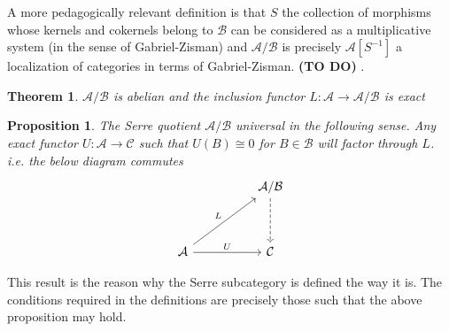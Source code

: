 \documentclass[12pt]{article}
\numberwithin{equation}{section}
\newcounter{dummy} \numberwithin{dummy}{section}
\newtheorem{theorem}[dummy]{Theorem}
\newtheorem{proposition}[dummy]{Proposition}
\begin{document}
\begin{appendices}
	
	A more pedagogically relevant definition is that $S$ the collection of morphisms whose kernels and cokernels belong to $\mathcal{B}$ can be considered as a multiplicative system (in the sense of Gabriel-Zisman) and $\mathcal{A/B}$ is precisely $\mathcal{A}[S^{-1}]$ a localization of categories in terms of Gabriel-Zisman. \textbf{(TO DO)} \cite{gabriel1967calculus}.
	\begin{theorem}
		$\mathcal{A/B}$ is abelian and the inclusion functor $L:\mathcal{A} \to \mathcal{A/B}$ is exact
	\end{theorem}
	\begin{proposition}
		The Serre quotient $\mathcal{A/B}$ universal in the following sense. Any exact functor $U: \mathcal{A} \to \mathcal{C}$ such that $U(B)\cong 0$ for $B \in \mathcal{B}$ will factor through $L$. i.e. the below diagram commutes	
		\[\begin{tikzcd}
			&& {\mathcal{A/B}} \\
			\\
			{\mathcal{A}} && {\mathcal{C}}
			\arrow[dashed, from=1-3, to=3-3]
			\arrow["L", from=3-1, to=1-3]
			\arrow["U", from=3-1, to=3-3]
		\end{tikzcd}\]
	\end{proposition}
	
	This result is the reason why the Serre subcategory is defined the way it is. The conditions required in the definitions are precisely those such that the above proposition may hold.
	
	

\end{appendices}
\end{document}
